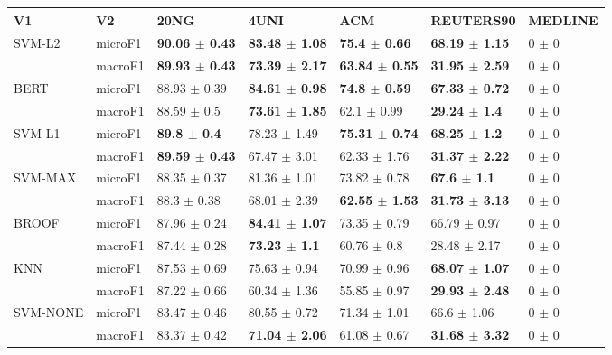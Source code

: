 \documentclass[]{article}
\begin{document}
\begin{table}[ht]
\centering
\begin{tabular}{lllllll}
  \hline
V1 & V2 & 20NG & 4UNI & ACM & REUTERS90 & MEDLINE \\ 
  \cline{3-7} \hline
\multirow{2}{*}{SVM-L2} & microF1 & \bf{90.06 $\pm$  0.43} & \bf{83.48 $\pm$  1.08} & \bf{75.4 $\pm$  0.66} & \bf{68.19 $\pm$  1.15} & 0 $\pm$  0 \\ 
   & macroF1 & \bf{89.93 $\pm$  0.43} & \bf{73.39 $\pm$  2.17} & \bf{63.84 $\pm$  0.55} & \bf{31.95 $\pm$  2.59} & 0 $\pm$  0 \\ 
   \cline{3-7}\multirow{2}{*}{BERT} & microF1 & 88.93 $\pm$  0.39 & \bf{84.61 $\pm$  0.98} & \bf{74.8 $\pm$  0.59} & \bf{67.33 $\pm$  0.72} & 0 $\pm$  0 \\ 
   & macroF1 & 88.59 $\pm$  0.5 & \bf{73.61 $\pm$  1.85} & 62.1 $\pm$  0.99 & \bf{29.24 $\pm$  1.4} & 0 $\pm$  0 \\ 
   \cline{3-7}\multirow{2}{*}{SVM-L1} & microF1 & \bf{89.8 $\pm$  0.4} & 78.23 $\pm$  1.49 & \bf{75.31 $\pm$  0.74} & \bf{68.25 $\pm$  1.2} & 0 $\pm$  0 \\ 
   & macroF1 & \bf{89.59 $\pm$  0.43} & 67.47 $\pm$  3.01 & 62.33 $\pm$  1.76 & \bf{31.37 $\pm$  2.22} & 0 $\pm$  0 \\ 
   \cline{3-7}\multirow{2}{*}{SVM-MAX} & microF1 & 88.35 $\pm$  0.37 & 81.36 $\pm$  1.01 & 73.82 $\pm$  0.78 & \bf{67.6 $\pm$  1.1} & 0 $\pm$  0 \\ 
   & macroF1 & 88.3 $\pm$  0.38 & 68.01 $\pm$  2.39 & \bf{62.55 $\pm$  1.53} & \bf{31.73 $\pm$  3.13} & 0 $\pm$  0 \\ 
   \cline{3-7}\multirow{2}{*}{BROOF} & microF1 & 87.96 $\pm$  0.24 & \bf{84.41 $\pm$  1.07} & 73.35 $\pm$  0.79 & 66.79 $\pm$  0.97 & 0 $\pm$  0 \\ 
   & macroF1 & 87.44 $\pm$  0.28 & \bf{73.23 $\pm$  1.1} & 60.76 $\pm$  0.8 & 28.48 $\pm$  2.17 & 0 $\pm$  0 \\ 
   \cline{3-7}\multirow{2}{*}{KNN} & microF1 & 87.53 $\pm$  0.69 & 75.63 $\pm$  0.94 & 70.99 $\pm$  0.96 & \bf{68.07 $\pm$  1.07} & 0 $\pm$  0 \\ 
   & macroF1 & 87.22 $\pm$  0.66 & 60.34 $\pm$  1.36 & 55.85 $\pm$  0.97 & \bf{29.93 $\pm$  2.48} & 0 $\pm$  0 \\ 
   \cline{3-7}\multirow{2}{*}{SVM-NONE} & microF1 & 83.47 $\pm$  0.46 & 80.55 $\pm$  0.72 & 71.34 $\pm$  1.01 & 66.6 $\pm$  1.06 & 0 $\pm$  0 \\ 
   & macroF1 & 83.37 $\pm$  0.42 & \bf{71.04 $\pm$  2.06} & 61.08 $\pm$  0.67 & \bf{31.68 $\pm$  3.32} & 0 $\pm$  0 \\ 

\end{tabular}
\end{table}
\end{document}
